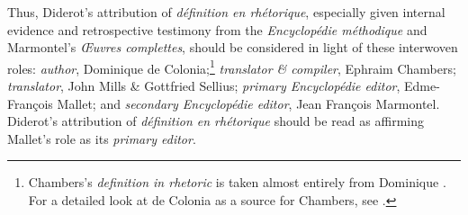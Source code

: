 \documentclass[output=paper]{langscibook}
\begin{document}
Thus, Diderot’s attribution of \emph{définition en rhétorique}, especially given internal evidence and retrospective testimony from the \emph{Encyclopédie méthodique} and Marmontel’s \emph{Œuvres complettes}, should be considered in light of these interwoven roles: \emph{author}, Dominique de Colonia;\footnote{Chambers’s \emph{definition in rhetoric} is taken almost entirely from Dominique \citet{De_colonia1710}. For a detailed look at de Colonia as a source for Chambers, see \citet[206-228]{Bocast2016}.}  \emph{translator \& compiler}, Ephraim Chambers; \emph{translator}, John Mills \& Gottfried Sellius; \emph{primary Encyclopédie editor}, Edme-François Mallet; and \emph{secondary Encyclopédie editor}, Jean François Marmontel. Diderot’s attribution of \emph{définition en rhétorique} should be read as affirming Mallet’s role as its \emph{primary editor}.
\end{document}
